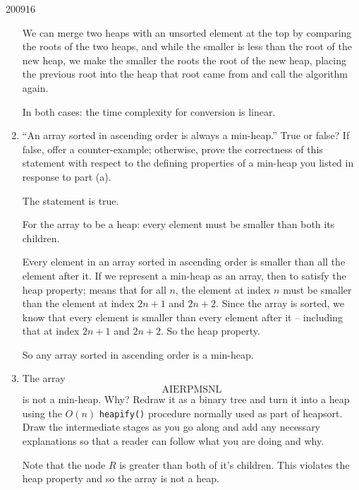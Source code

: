 \documentclass[10pt,\jkfside,a4paper]{article}
\begin{document}
\begin{examquestion}{2009}{1}{6}
\begin{enumerate}[label=(\alph*)]
We can merge two heaps with an unsorted element at the top by comparing the roots of the two heaps, 
and while the smaller is less than the root of the new heap, we make the smaller the roots the 
root of the new heap, placing the previous root into the heap that root came from and call the algorithm 
again.

In both cases: the time complexity for conversion is linear.

\item ``An array sorted in ascending order is always a min-heap.'' True or false?
If false, offer a counter-example; otherwise, prove the correctness of this
statement with respect to the defining properties of a min-heap you listed
in response to part (a).

The statement is true.

For the array to be a heap: every element must be smaller than both its children.

Every element in an array sorted in ascending order is smaller than all the element after it. 
If we represent a min-heap as an array, then to satisfy the heap property; 
means that for all $n$, the element at index $n$ must be smaller than the element 
at index $2n + 1$ and $2n + 2$. Since the array is sorted, we know that every element is smaller than 
every element after it -- including that at index $2n + 1$ and $2n + 2$. So the heap property.

So any array sorted in ascending order is a min-heap.

\item The array
\begin{equation*}
\mathrm{A I E R P M S N L}
\end{equation*}
is not a min-heap. Why? Redraw it as a binary tree and turn it into a heap
using the $O(n)$ {\tt heapify()} procedure normally used as part of heapsort. Draw
the intermediate stages as you go along and add any necessary explanations
so that a reader can follow what you are doing and why.

Note that the node $R$ is greater than both of it's children. This violates the heap property and 
so the array is not a heap.


\end{enumerate}
\end{examquestion}
\end{document}
